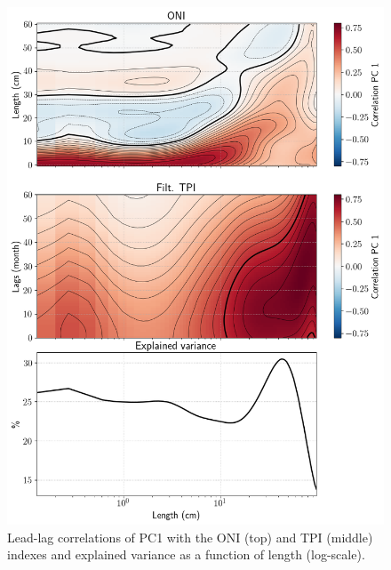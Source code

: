 \begin{figure}
    \centering
    \includegraphics[scale=0.5]{figs/correlations_eof_oni_tpi_eof_1.png}
    \caption{Lead-lag correlations of PC1 with the ONI (top) and TPI (middle) indexes and explained variance as a function of length (log-scale).}
    \label{fig:pc_corrs}
\end{figure}

